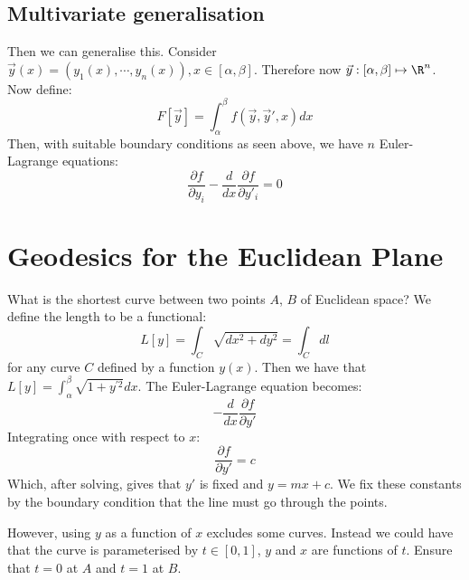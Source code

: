 \documentclass[../Main.tex]{subfiles}
\begin{document}
\subsection{Multivariate generalisation}
Then we can generalise this. Consider $\vec{y}(x) = (y_1(x), \cdots, y_n(x)), x \in [\alpha, \beta]$. Therefore now $\vec{y} : [\alpha, \beta] \mapsto \R^n$. Now define:
\begin{equation*}
    F[\vec{y}] = \int_\alpha^\beta f(\vec{y}, \vec{y}', x) dx
\end{equation*}
Then, with suitable boundary conditions as seen above, we have $n$ Euler-Lagrange equations:
\begin{equation}
    \frac{\partial f}{\partial y_i} - \frac{d}{dx} \frac{\partial f}{\partial y'_i} = 0
    \label{eqnMultivariateEulerLagrange}
\end{equation}
\section{Geodesics for the Euclidean Plane}
What is the shortest curve between two points $A$, $B$ of Euclidean space? We define the length to be a functional:
\begin{equation*}
    L[y] = \int_C \sqrt{dx^2 + dy^2} = \int_C dl
\end{equation*}
for any curve $C$ defined by a function $y(x)$.
Then we have that $L[y] = \int_\alpha^\beta \sqrt{1 + y^{\prime 2}}dx$. The Euler-Lagrange equation becomes:
\begin{equation*}
    -\frac{d}{dx} \frac{\partial f}{\partial y'}
\end{equation*}
Integrating once with respect to $x$:
\begin{equation*}
    \frac{\partial f}{\partial y'} = c
\end{equation*}
Which, after solving, gives that $y'$ is fixed and $y = mx + c$. We fix these constants by the boundary condition that the line must go through the points.

However, using $y$ as a function of $x$ excludes some curves. Instead we could have that the curve is parameterised by $t \in [0, 1]$, $y$ and $x$ are functions of $t$. Ensure that $t = 0$ at $A$ and $t = 1$ at $B$.
\end{document}

